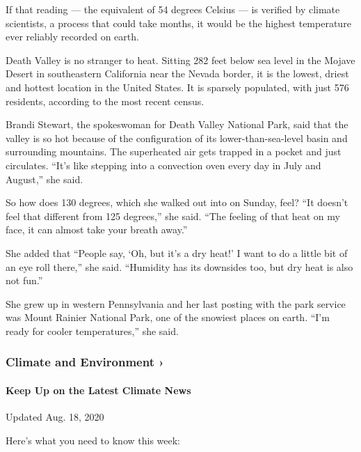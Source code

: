 If that reading --- the equivalent of 54 degrees Celsius --- is verified
by climate scientists, a process that could take months, it would be the
highest temperature ever reliably recorded on earth.

Death Valley is no stranger to heat. Sitting 282 feet below sea level in
the Mojave Desert in southeastern California near the Nevada border, it
is the lowest, driest and hottest location in the United States. It is
sparsely populated, with just 576 residents, according to the most
recent census.

Brandi Stewart, the spokeswoman for Death Valley National Park, said
that the valley is so hot because of the configuration of its
lower-than-sea-level basin and surrounding mountains. The superheated
air gets trapped in a pocket and just circulates. ``It's like stepping
into a convection oven every day in July and August,'' she said.

So how does 130 degrees, which she walked out into on Sunday, feel? ``It
doesn't feel that different from 125 degrees,'' she said. ``The feeling
of that heat on my face, it can almost take your breath away.''

She added that ``People say, `Oh, but it's a dry heat!' I want to do a
little bit of an eye roll there,'' she said. ``Humidity has its
downsides too, but dry heat is also not fun.''

She grew up in western Pennsylvania and her last posting with the park
service was Mount Rainier National Park, one of the snowiest places on
earth. ``I'm ready for cooler temperatures,'' she said.

\href{https://www.nytimes3xbfgragh.onion/section/climate?action=click\&pgtype=Article\&state=default\&region=MAIN_CONTENT_1\&context=storylines_keepup}{}

\hypertarget{climate-and-environment-}{%
\subsubsection{Climate and Environment
›}\label{climate-and-environment-}}

\hypertarget{keep-up-on-the-latest-climate-news}{%
\paragraph{Keep Up on the Latest Climate
News}\label{keep-up-on-the-latest-climate-news}}

Updated Aug. 18, 2020

Here's what you need to know this week:

